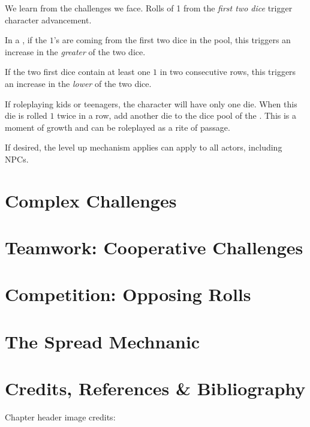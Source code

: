 \label{subsec:character_advancement}

We learn from the challenges we face. Rolls of 1 from the \emph{first two dice} trigger
character advancement.

In a , if the $1$'s are coming from the first two dice in the pool, this
triggers an increase in the \emph{greater} of the two dice.

If the two first dice contain at least one $1$ in two consecutive rows, this triggers an increase
in the \emph{lower} of the two dice.

If roleplaying kids or teenagers, the character will have only one die. When this die is rolled
$1$ twice in a row, add another die to the dice pool of the .
This is a moment of growth and can be roleplayed as a rite of passage.

If desired, the level up mechanism applies can apply to all actors, including NPCs.

\section{Complex Challenges}

\section{Teamwork: Cooperative Challenges}


\section{Competition: Opposing Rolls}

\section{The Spread Mechnanic}

\section*{Credits, References \& Bibliography}

Chapter header image credits: \cite{dice_image}

\printbibliography[heading=none]
